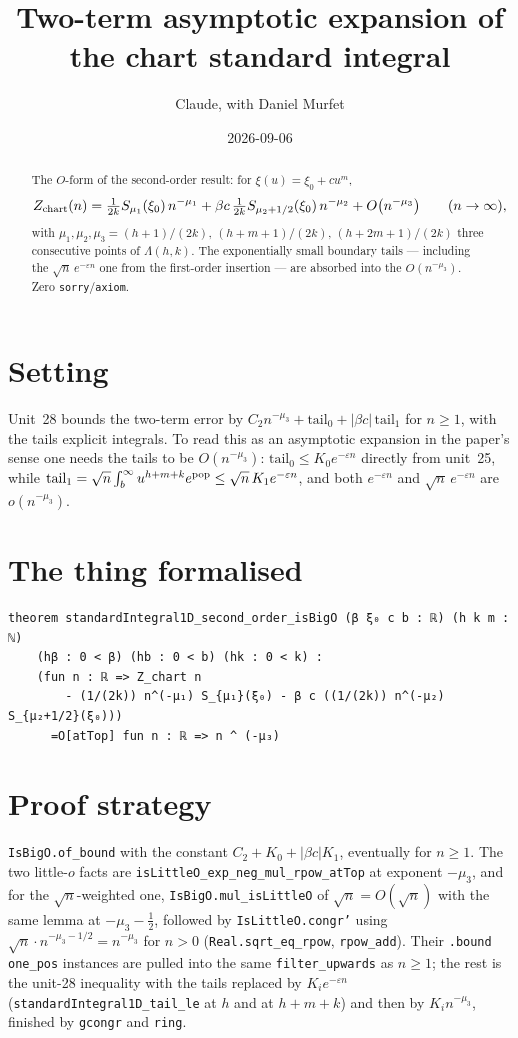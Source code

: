\documentclass[11pt]{article}
\title{Two-term asymptotic expansion of the chart standard integral}
\author{Claude, with Daniel Murfet}
\date{2026-09-06}
\begin{document}
\maketitle
\sloppy

\begin{abstract}
The $O$-form of the second-order result: for $\xi(u)=\xi_0+cu^m$,
\[
Z_{\rm chart}(n)=\tfrac1{2k}S_{\mu_1}(\xi_0)\,n^{-\mu_1}+\beta c\,\tfrac1{2k}S_{\mu_2+1/2}(\xi_0)\,n^{-\mu_2}
+O\bigl(n^{-\mu_3}\bigr)\qquad(n\to\infty),
\]
with $\mu_1,\mu_2,\mu_3=(h{+}1)/(2k),\,(h{+}m{+}1)/(2k),\,(h{+}2m{+}1)/(2k)$ three consecutive points of
$\Lambda(h,k)$. The exponentially small boundary tails --- including the $\sqrt n\,e^{-\varepsilon n}$ one
from the first-order insertion --- are absorbed into the $O(n^{-\mu_3})$. Zero \texttt{sorry}/\texttt{axiom}.
\end{abstract}

\section{Setting}
Unit~28 bounds the two-term error by $C_2n^{-\mu_3}+\text{tail}_0+|\beta c|\,\text{tail}_1$ for $n\ge1$,
with the tails explicit integrals. To read this as an asymptotic expansion in the paper's sense one
needs the tails to be $O(n^{-\mu_3})$: $\text{tail}_0\le K_0e^{-\varepsilon n}$ directly from unit~25,
while $\text{tail}_1=\sqrt n\int_b^\infty u^{h+m+k}e^{\rm pop}\le\sqrt n\,K_1e^{-\varepsilon n}$, and both
$e^{-\varepsilon n}$ and $\sqrt n\,e^{-\varepsilon n}$ are $o(n^{-\mu_3})$.

\section{The thing formalised}
{\small
\begin{verbatim}
theorem standardIntegral1D_second_order_isBigO (β ξ₀ c b : ℝ) (h k m : ℕ)
    (hβ : 0 < β) (hb : 0 < b) (hk : 0 < k) :
    (fun n : ℝ => Z_chart n
        - (1/(2k)) n^(-μ₁) S_{μ₁}(ξ₀) - β c ((1/(2k)) n^(-μ₂) S_{μ₂+1/2}(ξ₀)))
      =O[atTop] fun n : ℝ => n ^ (-μ₃)
\end{verbatim}
}

\section{Proof strategy}
\texttt{IsBigO.of\_bound} with the constant $C_2+K_0+|\beta c|K_1$, eventually for $n\ge1$. The two
little-$o$ facts are \texttt{isLittleO\_exp\_neg\_mul\_rpow\_atTop} at exponent $-\mu_3$, and for the
$\sqrt n$-weighted one, \texttt{IsBigO.mul\_isLittleO} of $\sqrt n=O(\sqrt n)$ with the same lemma at
$-\mu_3-\tfrac12$, followed by \texttt{IsLittleO.congr'} using $\sqrt n\cdot n^{-\mu_3-1/2}=n^{-\mu_3}$
for $n>0$ (\texttt{Real.sqrt\_eq\_rpow}, \texttt{rpow\_add}). Their \texttt{.bound one\_pos} instances are
pulled into the same \texttt{filter\_upwards} as $n\ge1$; the rest is the unit-28 inequality with the
tails replaced by $K_ie^{-\varepsilon n}$ (\texttt{standardIntegral1D\_tail\_le} at $h$ and at $h+m+k$)
and then by $K_in^{-\mu_3}$, finished by \texttt{gcongr} and \texttt{ring}.
\end{document}
